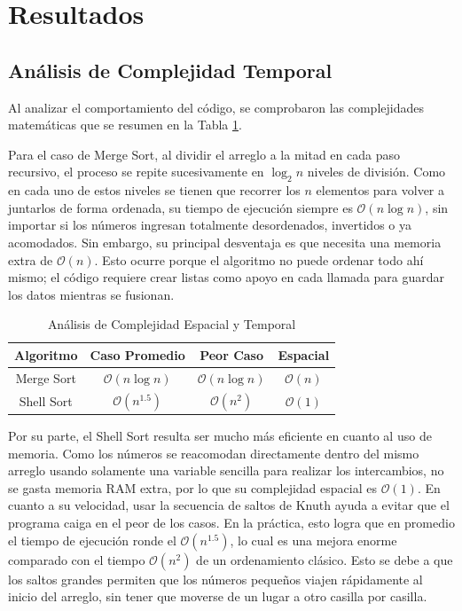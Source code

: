 \documentclass[conference]{IEEEtran}
\begin{document}
\section{Resultados}

\subsection{Análisis de Complejidad Temporal}
Al analizar el comportamiento del código, se comprobaron las complejidades matemáticas que se resumen en la Tabla \ref{tab:complejidad}. 

Para el caso de Merge Sort, al dividir el arreglo a la mitad en cada paso recursivo, el proceso se repite sucesivamente en $\log_2 n$ niveles de división. Como en cada uno de estos niveles se tienen que recorrer los $n$ elementos para volver a juntarlos de forma ordenada, su tiempo de ejecución siempre es $\mathcal{O}(n \log n)$, sin importar si los números ingresan totalmente desordenados, invertidos o ya acomodados. Sin embargo, su principal desventaja es que necesita una memoria extra de $\mathcal{O}(n)$. Esto ocurre porque el algoritmo no puede ordenar todo ahí mismo; el código requiere crear listas como apoyo en cada llamada para guardar los datos mientras se fusionan.

\begin{table}[htbp]
\caption{Análisis de Complejidad Espacial y Temporal}
\begin{center}
\begin{tabular}{|c|c|c|c|}
\hline
\textbf{Algoritmo} & \textbf{Caso Promedio} & \textbf{Peor Caso} & \textbf{Espacial} \\
\hline
Merge Sort & $\mathcal{O}(n \log n)$ & $\mathcal{O}(n \log n)$ & $\mathcal{O}(n)$ \\
\hline
Shell Sort & $\mathcal{O}(n^{1.5})$ & $\mathcal{O}(n^2)$ & $\mathcal{O}(1)$ \\
\hline
\end{tabular}
\label{tab:complejidad}
\end{center}
\end{table}

Por su parte, el Shell Sort resulta ser mucho más eficiente en cuanto al uso de memoria. Como los números se reacomodan directamente dentro del mismo arreglo usando solamente una variable sencilla para realizar los intercambios, no se gasta memoria RAM extra, por lo que su complejidad espacial es $\mathcal{O}(1)$. En cuanto a su velocidad, usar la secuencia de saltos de Knuth ayuda a evitar que el programa caiga en el peor de los casos. En la práctica, esto logra que en promedio el tiempo de ejecución ronde el $\mathcal{O}(n^{1.5})$, lo cual es una mejora enorme comparado con el tiempo $\mathcal{O}(n^2)$ de un ordenamiento clásico. Esto se debe a que los saltos grandes permiten que los números pequeños viajen rápidamente al inicio del arreglo, sin tener que moverse de un lugar a otro casilla por casilla.
\end{document}
